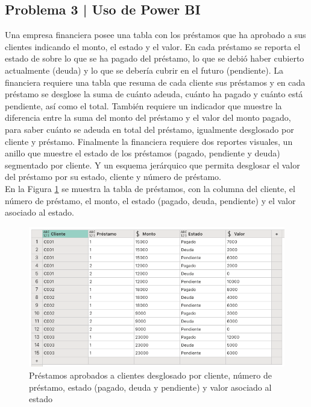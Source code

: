 \documentclass{article}
\begin{document}
\clearpage

\subsection*{Problema 3 | Uso de Power BI}

Una empresa financiera posee una tabla con los préstamos que ha aprobado a sus clientes indicando el monto, el estado y el valor. En cada préstamo se reporta el estado de sobre lo que se ha pagado del préstamo, lo que se debió haber cubierto actualmente (deuda) y lo que se debería cubrir en el futuro (pendiente). La financiera requiere una tabla que resuma de cada cliente sus préstamos y en cada préstamo se desglose la suma de cuánto adeuda, cuánto ha pagado y cuánto está pendiente, así como el total. También requiere un indicador que muestre la diferencia entre la suma del monto del préstamo y el valor del monto pagado, para saber cuánto se adeuda en total del préstamo, igualmente desglosado por cliente y préstamo. Finalmente la financiera requiere dos reportes visuales, un anillo que muestre el estado de los préstamos (pagado, pendiente y deuda) segmentado por cliente. Y un esquema jerárquico que permita desglosar el valor del préstamo por su estado, cliente y número de préstamo.
\\[12pt]
En la Figura \ref{fig:p103} se muestra la tabla de préstamos, con la columna del cliente, el número de préstamo, el monto, el estado (pagado, deuda, pendiente) y el valor asociado al estado.
\begin{figure}[!ht]
    \centering
    \begin{minipage}{\textwidth}
        \centering
        \includegraphics[width=\textwidth]{figures/p103.png}
    \end{minipage}
    \captionsetup{width=0.9\textwidth}
    \caption{Préstamos aprobados a clientes desglosado por cliente, número de préstamo, estado (pagado, deuda y pendiente) y valor asociado al estado}
    \label{fig:p103}
\end{figure}
\\
\end{document}
